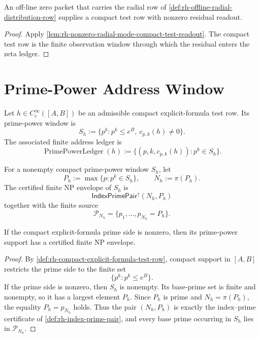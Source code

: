 \begin{theorem}
\label{thm:rh-offline-zero-supplies-compact-radial-witness}
An off-line zero packet that carries the radial row of
\autoref{def:rh-offline-radial-distribution-row} supplies a compact
test row with nonzero residual readout.
\end{theorem}

\begin{proof}
Apply
\autoref{lem:rh-nonzero-radial-mode-compact-test-readout}.  The compact
test row is the finite observation window through which the residual
enters the zeta ledger.
\end{proof}

\section{Prime-Power Address Window}
\label{sec:rh-global-window-prime-power-address}

\begin{definition}
\label{def:rh-compact-prime-power-window}
Let $h\in C_c^\infty([A,B])$ be an admissible compact
explicit-formula test row.  Its prime-power window is
$$
S_h:=\{p^k:p^k\le e^B,\ c_{p,k}(h)\ne0\}.
$$
The associated finite address ledger is
$$
\operatorname{PrimePowerLedger}(h)
:=
\{(p,k,c_{p,k}(h)):p^k\in S_h\}.
$$
\end{definition}

\begin{definition}
\label{def:rh-certified-finite-np-envelope}
For a nonempty compact prime-power window $S_h$, let
$$
P_h:=\max\{p:p^k\in S_h\},
\qquad
N_h:=\pi(P_h).
$$
The certified finite NP envelope of $S_h$ is
$$
\mathsf{IndexPrimePair}^{\uparrow}(N_h,P_h)
$$
together with the finite source
$$
\mathcal P_{N_h}=\{p_1,\ldots,p_{N_h}=P_h\}.
$$
\end{definition}

\begin{theorem}
\label{thm:rh-compact-prime-power-support-certified-np-envelope}
If the compact explicit-formula prime side is nonzero, then its
prime-power support has a certified finite NP envelope.
\end{theorem}

\begin{proof}
By \autoref{def:rh-compact-explicit-formula-test-row}, compact support
in $[A,B]$ restricts the prime side to the finite set
$$
\{p^k:p^k\le e^B\}.
$$
If the prime side is nonzero, then $S_h$ is nonempty.  Its base-prime
set is finite and nonempty, so it has a largest element $P_h$.  Since
$P_h$ is prime and $N_h=\pi(P_h)$, the equality $P_h=p_{N_h}$ holds.
Thus the pair $(N_h,P_h)$ is exactly the index--prime certificate of
\autoref{def:rh-index-prime-pair}, and every base prime occurring in
$S_h$ lies in $\mathcal P_{N_h}$.
\end{proof}

